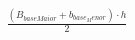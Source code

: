 \documentclass[preview]{standalone}
\begin{document}
\begin{align*}
\frac {(B_{baseMaior} + b_{base_Menor}) \cdot h}{2}
\end{align*}
\end{document}
